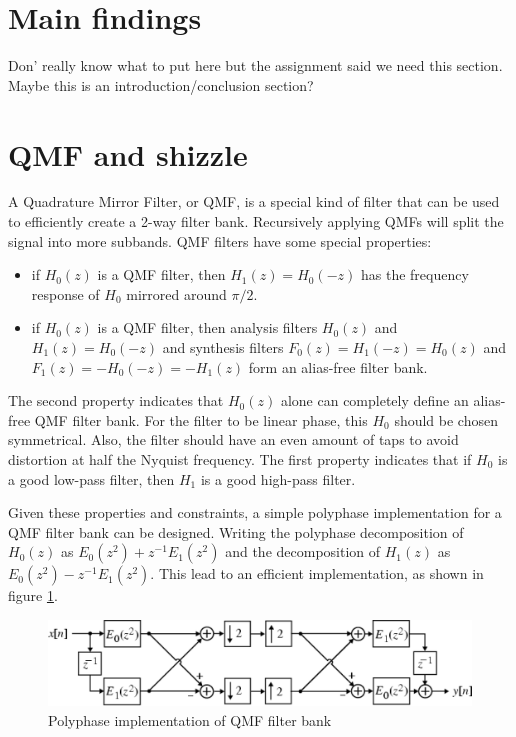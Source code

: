\documentclass[a4paper]{article}
\begin{document}
\section{Main findings}
Don' really know what to put here but the assignment said we need this section. Maybe this is an introduction/conclusion section?

\section{QMF and shizzle}
A Quadrature Mirror Filter, or QMF, is a special kind of filter that can be used to efficiently create a 2-way filter bank. Recursively applying QMFs will split the signal into more subbands. QMF filters have some special properties:
\begin{itemize}
\item if $H_0(z)$ is a QMF filter, then $H_1(z) = H_0(-z)$ has the frequency response of $H_0$ mirrored around $\pi/2$.
\item if $H_0(z)$ is a QMF filter, then analysis filters $H_0(z)$ and $H_1(z) = H_0(-z)$ and synthesis filters $F_0(z)=H_1(-z)=H_0(z)$ and $F_1(z)=-H_0(-z) = -H_1(z)$ form an alias-free filter bank.
\end{itemize}
The second property indicates that $H_0(z)$ alone can completely define an alias-free QMF filter bank. For the filter to be linear phase, this $H_0$ should be chosen symmetrical. Also, the filter should have an even amount of taps to avoid distortion at half the Nyquist frequency. The first property indicates that if $H_0$ is a good low-pass filter, then $H_1$ is a good high-pass filter.

Given these properties and constraints, a simple polyphase implementation for a QMF filter bank can be designed. Writing the polyphase decomposition of $H_0(z)$ as $E_0(z^2) + z^{-1} E_1(z^2)$ and the decomposition of $H_1(z)$ as $E_0(z^2) - z^{-1} E_1(z^2)$. This lead to an efficient implementation, as shown in figure \ref{fig:qmf}.

\begin{figure}[hbt]
\includegraphics[width = \textwidth]{qmf}
\caption{Polyphase implementation of QMF filter bank}
\label{fig:qmf}
\end{figure}
\end{document}
